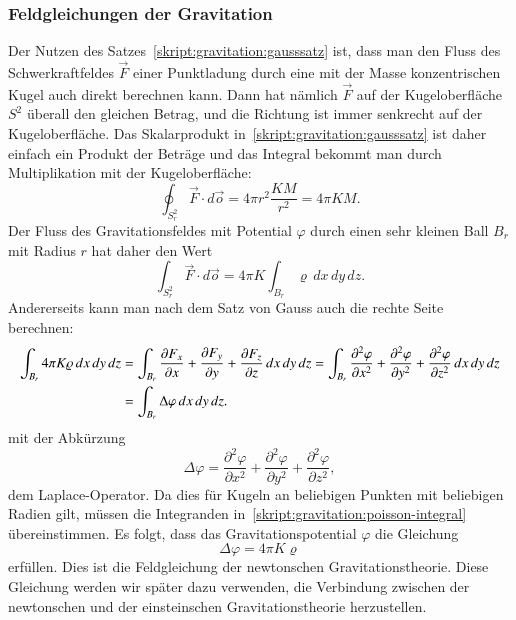 \subsubsection{Feldgleichungen der Gravitation}
Der Nutzen des Satzes~\ref{skript:gravitation:gausssatz}
ist, dass man den Fluss des Schwerkraftfeldes
$\vec F$ einer Punktladung durch eine mit der Masse konzentrischen
Kugel auch direkt berechnen kann.
Dann hat nämlich $\vec F$ auf der Kugeloberfläche $S^2$ überall den gleichen
Betrag, und die Richtung ist immer senkrecht auf der Kugeloberfläche.
Das Skalarprodukt in~\eqref{skript:gravitation:gausssatz} ist daher
einfach ein Produkt der Beträge und das Integral bekommt man durch
Multiplikation mit der Kugeloberfläche:
\[
\oint_{S^2_r} \vec F\cdot d\vec o
=
4\pi r^2
\frac{KM}{r^2}
=
4\pi KM.
\]
Der Fluss des Gravitationsfeldes mit Potential $\varphi$ durch einen
sehr kleinen Ball $B_r$ mit Radius $r$ hat daher den Wert
\[
\int_{S^2_r}\vec F\cdot d\vec o
=
4\pi K\int_{B_r} \varrho\,dx\,dy\,dz.
\]
Andererseits kann man nach dem Satz von Gauss auch die rechte 
Seite berechnen:
\begin{align}
\int_{B_r} 4\pi K\varrho\,dx\,dy\,dz
&=
\int_{B_r}
\frac{\partial F_x}{\partial x}+
\frac{\partial F_y}{\partial y}+
\frac{\partial F_z}{\partial z}
\,dx\,dy\,dz
=
\int_{B_r}
\frac{\partial^2\varphi}{\partial x^2}+
\frac{\partial^2\varphi}{\partial y^2}+
\frac{\partial^2\varphi}{\partial z^2}
\,dx\,dy\,dz
\notag
\\
&=
\int_{B_r} \Delta\varphi\,dx\,dy\,dz.
\label{skript:gravitation:poisson-integral}
\end{align}
mit der Abkürzung
\begin{equation*}
\Delta \varphi
=
\frac{\partial^2\varphi}{\partial x^2}+
\frac{\partial^2\varphi}{\partial y^2}+
\frac{\partial^2\varphi}{\partial z^2},
\end{equation*}
dem Laplace-Operator.
Da dies für Kugeln an beliebigen Punkten mit beliebigen Radien 
gilt, müssen die Integranden in~\eqref{skript:gravitation:poisson-integral}
übereinstimmen.
Es folgt, dass das Gravitationspotential $\varphi$ die Gleichung
\begin{equation}
\Delta \varphi = 4\pi K\varrho
\label{skript:gravitation:potentialgleichung}
\end{equation}
erfüllen.
Dies ist die Feldgleichung der newtonschen Gravitationstheorie.
Diese Gleichung werden wir später dazu verwenden, die Verbindung zwischen
der newtonschen und der einsteinschen Gravitationstheorie herzustellen.

